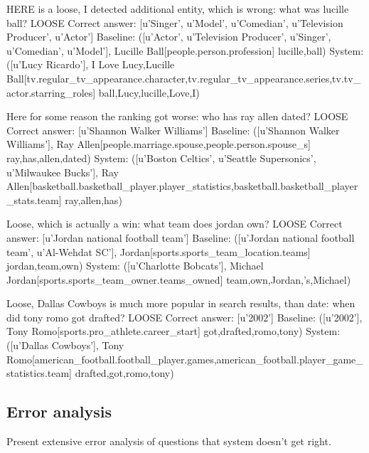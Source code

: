 HERE is a loose, I detected additional entity, which is wrong:
what was lucille ball? LOOSE
Correct answer:  [u'Singer', u'Model', u'Comedian', u'Television Producer', u'Actor']
Baseline:  ([u'Actor', u'Television Producer', u'Singer', u'Comedian', u'Model'], Lucille Ball[people.person.profession] lucille,ball)
System:  ([u'Lucy Ricardo'], I Love Lucy,Lucille Ball[tv.regular\_tv\_appearance.character,tv.regular\_tv\_appearance.series,tv.tv\_actor.starring\_roles] ball,Lucy,lucille,Love,I)


Here for some reason the ranking got worse:
who has ray allen dated? LOOSE
Correct answer:  [u'Shannon Walker Williams']
Baseline:  ([u'Shannon Walker Williams'], Ray Allen[people.marriage.spouse,people.person.spouse\_s] ray,has,allen,dated)
System:  ([u'Boston Celtics', u'Seattle Supersonics', u'Milwaukee Bucks'], Ray Allen[basketball.basketball\_player.player\_statistics,basketball.basketball\_player\_stats.team] ray,allen,has)


Loose, which is actually a win:
what team does jordan own? LOOSE
Correct answer:  [u'Jordan national football team']
Baseline:  ([u'Jordan national football team', u'Al-Wehdat SC'], Jordan[sports.sports\_team\_location.teams] jordan,team,own)
System:  ([u'Charlotte Bobcats'], Michael Jordan[sports.sports\_team\_owner.teams\_owned] team,own,Jordan,'s,Michael)

Loose, Dallas Cowboys is much more popular in search results, than date:
when did tony romo got drafted? LOOSE
Correct answer:  [u'2002']
Baseline:  ([u'2002'], Tony Romo[sports.pro\_athlete.career\_start] got,drafted,romo,tony)
System:  ([u'Dallas Cowboys'], Tony Romo[american\_football.football\_player.games,american\_football.player\_game\_statistics.team] drafted,got,romo,tony)

\subsection{Error analysis}

Present extensive error analysis of questions that system doesn't get right.
